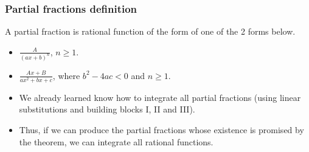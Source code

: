 \begin{frame}
\frametitle{Partial fractions definition}
\begin{definition} 
A partial fraction is rational function of the form of one of the 2 forms below.
\begin{itemize}
\item $\frac{A}{(ax+b)^n} $, $n\geq 1$.
\item $\frac{Ax+B}{ax^{2}+bx+c}$, where $b^2-4ac<0$ and $n\geq 1$.
\end{itemize}
\end{definition}
\begin{itemize}
\item<3-> We already learned know how to integrate all partial fractions (using linear substitutions and building blocks I, II and III). 
\item<4-> Thus, if we can produce the partial fractions whose existence is promised by the theorem, we can integrate all rational functions.
\end{itemize}
\end{frame}